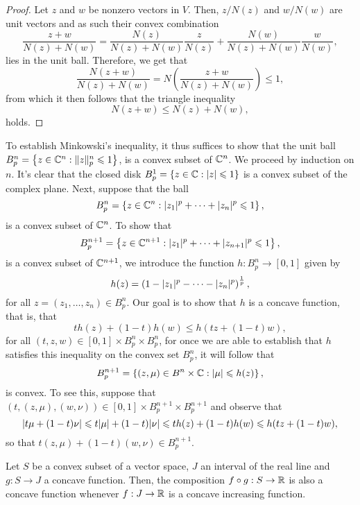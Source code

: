 \begin{proof}
  Let \(z\) and \(w\) be nonzero vectors in \(V\). Then, \(z/N(z)\) and
  \(w/N(w)\) are unit vectors and as such their convex combination
  \[
    \frac{z+w}{N(z)+N(w)}
    =
    \frac{N(z)}{N(z)+N(w)}\frac{z}{N(z)}
    +
    \frac{N(w)}{N(z)+N(w)}\frac{w}{N(w)}
    ,
  \]
  lies in the unit ball. Therefore, we get that
  \[
    \frac{N(z+w)}{N(z)+N(w)}
    =
    N\left(\frac{z+w}{N(z)+N(w)}\right)\leqslant{1},
  \]
  from which it then follows that the triangle inequality
  \[
    N(z+w)\leqslant{N(z)+N(w)},
  \]
  holds.
\end{proof}

To establish Minkowski's inequality, it thus suffices to show that the unit
ball
\(B^{n}_{p}=\left\{z\in\complexfield^{n}:\norm<n>(p)[z]\leqslant{1}\right\}\),
is a convex subset of \(\mathbb{C}^{n}\). We proceed by induction on \(n\).
It's clear that the closed disk
\(B^{1}_{p}=\left\{z\in\mathbb{C}:\lvert z\rvert\leqslant{1}\right\}\) is a convex
subset of the complex plane. Next, suppose that the ball
\[
  B^{n}_{p}
  =
  \left\{z\in\mathbb{C}^{n}:\lvert z_{1}\rvert^{p}+\cdots+\lvert z_{n}\rvert^{p}\leqslant{1}\right\},
\]
is a convex subset of \(\mathbb{C}^{n}\). To show that
\[
  B^{n+1}_{p}
  =
  \left\{z\in\mathbb{C}^{n+1}:\lvert z_{1}\rvert^{p}+\cdots+\lvert z_{n+1}\rvert^{p}\leqslant{1}\right\},
\]
is a convex subset of \(\mathbb{C}^{n+1}\), we introduce the function
\(h:B^{n}_{p}\to[0,1]\) given by
\[
	h(z)=\left(1-\lvert z_{1}\rvert^{p}-\cdots-\lvert z_{n}\rvert^{p}\right)^{\frac{1}{p}},
\]
for all \(z=(z_{1},\ldots,z_{n})\in{B^{n}_{p}}\). Our goal is to show that \(h\) is a concave function, that is, that
\[
	th(z)+(1-t)h(w)\leqslant{h(tz+(1-t)w)},
\]
for all \((t,z,w)\in{[0,1]\times{B^{n}_{p}}\times{B^{n}_{p}}}\), for once we
are able to establish that \(h\) satisfies this inequality on the convex set
\(B^{n}_{p}\), it will follow that
\[
	B^{n+1}_{p}
  =
  \left\{(z,\mu)\in{B^{n}\times\mathbb{C}}:\lvert\mu\rvert\leqslant{h(z)}\right\},
\]
is convex. To see this, suppose that
\((t,(z,\mu),(w,\nu))\in{[0,1]\times{B^{n+1}_{p}}\times{B^{n+1}_{p}}}\) and
observe that
\[
	\lvert t\mu+(1-t)\nu\rvert
  \leqslant{t\lvert\mu\rvert+(1-t)\lvert\nu\rvert}
  \leqslant{th(z)+(1-t)h(w)}
  \leqslant{h(tz+(1-t)w}),
\]
so that \(t(z,\mu)+(1-t)(w,\nu)\in{B^{n+1}_{p}}\).

\begin{lemma}
  Let \(S\) be a convex subset of a vector space, \(J\) an interval of the real
  line and \(g:S\to{J}\) a concave function. Then, the composition
  \(f\circ{g}:S\to\mathbb{R}\) is also a concave function whenever \(f:J\to\mathbb{R}\)
  is a concave increasing function.
\end{lemma}

